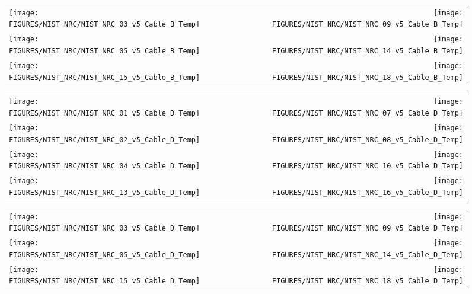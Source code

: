 \clearpage

\begin{figure}[h!]
\begin{tabular*}{\textwidth}{l@{\extracolsep{\fill}}r}
\texttt{[image: FIGURES/NIST\_NRC/NIST\_NRC\_03\_v5\_Cable\_B\_Temp]} &
\texttt{[image: FIGURES/NIST\_NRC/NIST\_NRC\_09\_v5\_Cable\_B\_Temp]} \\
\texttt{[image: FIGURES/NIST\_NRC/NIST\_NRC\_05\_v5\_Cable\_B\_Temp]} &
\texttt{[image: FIGURES/NIST\_NRC/NIST\_NRC\_14\_v5\_Cable\_B\_Temp]} \\
\texttt{[image: FIGURES/NIST\_NRC/NIST\_NRC\_15\_v5\_Cable\_B\_Temp]} &
\texttt{[image: FIGURES/NIST\_NRC/NIST\_NRC\_18\_v5\_Cable\_B\_Temp]}
\end{tabular*}
\label{NIST_NRC_Cable_B_Open}
\end{figure}

\clearpage


\begin{figure}[h!]
\begin{tabular*}{\textwidth}{l@{\extracolsep{\fill}}r}
\texttt{[image: FIGURES/NIST\_NRC/NIST\_NRC\_01\_v5\_Cable\_D\_Temp]} &
\texttt{[image: FIGURES/NIST\_NRC/NIST\_NRC\_07\_v5\_Cable\_D\_Temp]} \\
\texttt{[image: FIGURES/NIST\_NRC/NIST\_NRC\_02\_v5\_Cable\_D\_Temp]} &
\texttt{[image: FIGURES/NIST\_NRC/NIST\_NRC\_08\_v5\_Cable\_D\_Temp]} \\
\texttt{[image: FIGURES/NIST\_NRC/NIST\_NRC\_04\_v5\_Cable\_D\_Temp]} &
\texttt{[image: FIGURES/NIST\_NRC/NIST\_NRC\_10\_v5\_Cable\_D\_Temp]} \\
\texttt{[image: FIGURES/NIST\_NRC/NIST\_NRC\_13\_v5\_Cable\_D\_Temp]} &
\texttt{[image: FIGURES/NIST\_NRC/NIST\_NRC\_16\_v5\_Cable\_D\_Temp]}
\end{tabular*}
\label{NIST_NRC_Cable_D_Closed}
\end{figure}

\clearpage

\begin{figure}[h!]
\begin{tabular*}{\textwidth}{l@{\extracolsep{\fill}}r}
\texttt{[image: FIGURES/NIST\_NRC/NIST\_NRC\_03\_v5\_Cable\_D\_Temp]} &
\texttt{[image: FIGURES/NIST\_NRC/NIST\_NRC\_09\_v5\_Cable\_D\_Temp]} \\
\texttt{[image: FIGURES/NIST\_NRC/NIST\_NRC\_05\_v5\_Cable\_D\_Temp]} &
\texttt{[image: FIGURES/NIST\_NRC/NIST\_NRC\_14\_v5\_Cable\_D\_Temp]} \\
\texttt{[image: FIGURES/NIST\_NRC/NIST\_NRC\_15\_v5\_Cable\_D\_Temp]} &
\texttt{[image: FIGURES/NIST\_NRC/NIST\_NRC\_18\_v5\_Cable\_D\_Temp]}
\end{tabular*}
\label{NIST_NRC_Cable_D_Open}
\end{figure}

